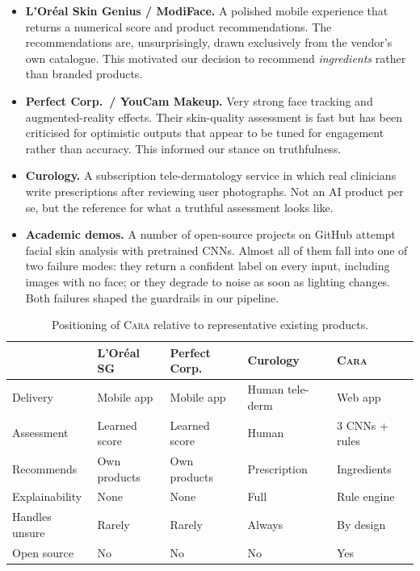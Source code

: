 \documentclass[11pt,a4paper,oneside]{report}
\newcommand{\cara}{\textsc{Cara}\xspace}
\begin{document}
\begin{itemize}
    \item \textbf{L'Or\'eal Skin Genius / ModiFace.} A polished mobile
        experience that returns a numerical score and product
        recommendations. The recommendations are, unsurprisingly,
        drawn exclusively from the vendor's own catalogue. This
        motivated our decision to recommend \emph{ingredients} rather
        than branded products.
    \item \textbf{Perfect Corp.\ / YouCam Makeup.} Very strong face
        tracking and augmented-reality effects. Their skin-quality
        assessment is fast but has been criticised for optimistic
        outputs that appear to be tuned for engagement rather than
        accuracy. This informed our stance on truthfulness.
    \item \textbf{Curology.} A subscription tele-dermatology service
        in which real clinicians write prescriptions after reviewing
        user photographs. Not an AI product per se, but the reference
        for what a truthful assessment looks like.
    \item \textbf{Academic demos.} A number of open-source projects
        on GitHub attempt facial skin analysis with pretrained CNNs.
        Almost all of them fall into one of two failure modes: they
        return a confident label on every input, including images
        with no face; or they degrade to noise as soon as lighting
        changes. Both failures shaped the guardrails in our pipeline.
\end{itemize}

\begin{table}[htbp]
    \centering
    \caption{Positioning of \cara relative to representative existing products.}
    \label{tab:positioning}
    \small
    \begin{tabularx}{\linewidth}{lXXXX}
        \toprule
        & \textbf{L'Or\'eal SG} & \textbf{Perfect Corp.} & \textbf{Curology} & \textbf{\cara} \\
        \midrule
        Delivery         & Mobile app       & Mobile app     & Human tele-derm  & Web app \\
        Assessment       & Learned score    & Learned score  & Human            & 3 CNNs + rules \\
        Recommends       & Own products     & Own products   & Prescription     & Ingredients \\
        Explainability   & None             & None           & Full             & Rule engine \\
        Handles unsure   & Rarely           & Rarely         & Always           & By design \\
        Open source      & No               & No             & No               & Yes \\
        \bottomrule
    \end{tabularx}
\end{table}
\end{document}
